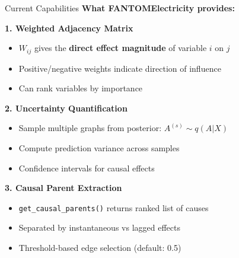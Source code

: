 \documentclass[aspectratio=169]{beamer}
\begin{document}
\begin{frame}{Current Capabilities}
\textbf{What FANTOMElectricity provides:}

\vspace{0.3cm}
\textbf{1. Weighted Adjacency Matrix}
\begin{itemize}
    \item $W_{ij}$ gives the \textbf{direct effect magnitude} of variable $i$ on $j$
    \item Positive/negative weights indicate direction of influence
    \item Can rank variables by importance
\end{itemize}

\vspace{0.3cm}
\textbf{2. Uncertainty Quantification}
\begin{itemize}
    \item Sample multiple graphs from posterior: $A^{(s)} \sim q(A | X)$
    \item Compute prediction variance across samples
    \item Confidence intervals for causal effects
\end{itemize}

\vspace{0.3cm}
\textbf{3. Causal Parent Extraction}
\begin{itemize}
    \item \texttt{get\_causal\_parents()} returns ranked list of causes
    \item Separated by instantaneous vs lagged effects
    \item Threshold-based edge selection (default: 0.5)
\end{itemize}
\end{frame}
\end{document}
